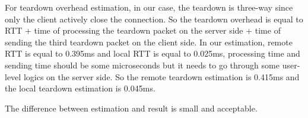 For teardown overhead estimation, in our case, the teardown is three-way since only the client actively close the connection. So the teardown overhead is equal to RTT + time of processing the teardown packet on the server side + time of sending the third teardown packet on the client side. In our estimation, remote RTT is equal to 0.395ms and local RTT is equal to 0.025ms, processing time and sending time should be some microseconds but it needs to go through some user-level logics on the server side. So the remote teardown estimation is 0.415ms and the local teardown estimation is 0.045ms.

The difference between estimation and result is small and acceptable.
